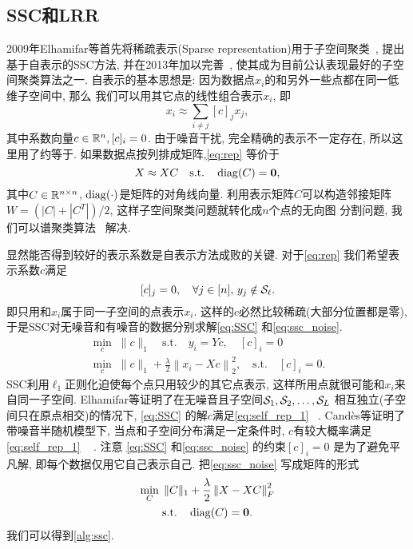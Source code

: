 \subsection{SSC和LRR}
2009年Elhamifar等首先将稀疏表示(Sparse representation)用于子空间聚类~\cite{elhamifar2009sparse}, 
提出基于自表示的SSC方法, 并在2013年加以完善~\cite{elhamifar2013sparse}, 使其成为目前公认表现最好的子空间聚类算法之一.
自表示的基本思想是: 因为数据点\(x_i\)的和另外一些点都在同一低维子空间中, 那么 
我们可以用其它点的线性组合表示\(x_i\), 即
\begin{equation}
  x_i \approx \sum_{i\neq j} [c]_j x_j, 
  \label{eq:rep}
\end{equation}
其中系数向量\(c\in \mathbb{R}^n, [c]_i = 0\). 
由于噪音干扰, 完全精确的表示不一定存在, 所以这里用了约等于.
如果数据点按列排成矩阵,\eqref{eq:rep} 等价于
\begin{equation}
  X \approx XC \quad \text{s.t.}\quad \operatorname{diag}(C) = \mathbf{0},
  \label{eq:matrix_rep}
\end{equation}
其中\(C\in \mathbb{R}^{n\times n}\), \(\operatorname{diag}(\cdot)\)是矩阵的对角线向量.
利用表示矩阵\(C\)可以构造邻接矩阵\(W=(|C|+|C^T|)/2\),
这样子空间聚类问题就转化成\(n\)个点的无向图
分割问题, 我们可以谱聚类算法~\cite{ng2002spectral} 解决.

显然能否得到较好的表示系数是自表示方法成败的关键.
对于\eqref{eq:rep} 我们希望表示系数\(c\)满足
\begin{equation}\label{eq:self_rep_1}
  [c]_j = 0, \quad  \forall j\in [n], \,y_j \notin \mathcal{S}_\ell .
\end{equation}
即只用和\(x_i\)属于同一子空间的点表示\(x_i\).
这样的\(c\)必然比较稀疏(大部分位置都是零), 
于是SSC对无噪音和有噪音的数据分别求解\eqref{eq:SSC} 和\eqref{eq:ssc_noise}. 
\begin{gather}
  \min_{c} \; \|c\|_1\quad \text{s.t.}\quad y_i=Yc, \quad [c]_i=0 \label{eq:SSC}\\
  \min_{c} \; \|c\|_1+\frac{\lambda}{2}\left\|x_i-Xc\right\|_2^2, \quad \text{s.t.} \quad
  [c]_i = 0. \label{eq:ssc_noise}
\end{gather}
SSC利用\(\ell_1\)正则化迫使每个点只用较少的其它点表示,
这样所用点就很可能和\(x_i\)来自同一子空间.
Elhamifar等证明了在无噪音且子空间\(\mathcal{S}_1, \mathcal{S}_2, \ldots, \mathcal{S}_L\)
相互独立(子空间只在原点相交)的情况下,
\eqref{eq:SSC} 的解\(c\)满足\eqref{eq:self_rep_1} ~\cite{elhamifar2013sparse}.
Cand\`{e}s等证明了带噪音半随机模型下, 当点和子空间分布满足一定条件时,
\(c\)有较大概率满足\eqref{eq:self_rep_1} ~\cite{soltanolkotabi2014robust} .
注意 \eqref{eq:SSC} 和\eqref{eq:ssc_noise} 的约束\([c]_i = 0\) 是为了避免平凡解,
即每个数据仅用它自己表示自己. 把\eqref{eq:ssc_noise} 写成矩阵的形式
\begin{equation}
  \begin{gathered}
    \min_C \; \|C\|_1+\frac{\lambda}{2}\left\|X-XC\right\|_F^2\\
    \text{s.t.} \quad \operatorname{diag}(C)=\mathbf{0}.
  \end{gathered}
  \label{eq:ssc_matrix}
\end{equation}
我们可以得到\autoref{alg:ssc}.  

